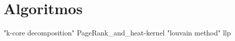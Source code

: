 \chapter{Algoritmos}


{"k-core decomposition"}
{PageRank_and_heat-kernel}
{"louvain method"}
{llp}
